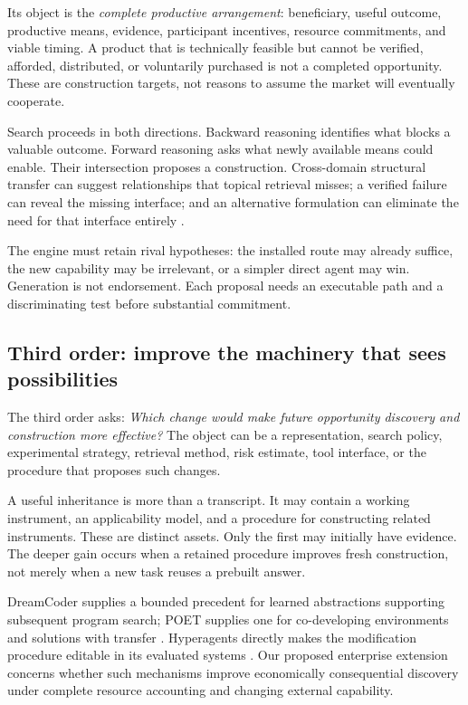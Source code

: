 \documentclass[11pt,letterpaper]{article}
\theoremstyle{remark}\newtheorem{remark}{Remark}[section]
\begin{document}
Its object is the \emph{complete productive arrangement}: beneficiary, useful outcome, productive means, evidence, participant incentives, resource commitments, and viable timing. A product that is technically feasible but cannot be verified, afforded, distributed, or voluntarily purchased is not a completed opportunity. These are construction targets, not reasons to assume the market will eventually cooperate.

Search proceeds in both directions. Backward reasoning identifies what blocks a valuable outcome. Forward reasoning asks what newly available means could enable. Their intersection proposes a construction. Cross-domain structural transfer can suggest relationships that topical retrieval misses; a verified failure can reveal the missing interface; and an alternative formulation can eliminate the need for that interface entirely \citep{boucher2026notes}.

The engine must retain rival hypotheses: the installed route may already suffice, the new capability may be irrelevant, or a simpler direct agent may win. Generation is not endorsement. Each proposal needs an executable path and a discriminating test before substantial commitment.

\subsection{Third order: improve the machinery that sees possibilities}
The third order asks: \emph{Which change would make future opportunity discovery and construction more effective?} The object can be a representation, search policy, experimental strategy, retrieval method, risk estimate, tool interface, or the procedure that proposes such changes.

A useful inheritance is more than a transcript. It may contain a working instrument, an applicability model, and a procedure for constructing related instruments. These are distinct assets. Only the first may initially have evidence. The deeper gain occurs when a retained procedure improves fresh construction, not merely when a new task reuses a prebuilt answer.

DreamCoder supplies a bounded precedent for learned abstractions supporting subsequent program search; POET supplies one for co-developing environments and solutions with transfer \citep{dreamcoder2020,poet2019}. Hyperagents directly makes the modification procedure editable in its evaluated systems \citep{hyperagents2026}. Our proposed enterprise extension concerns whether such mechanisms improve economically consequential discovery under complete resource accounting and changing external capability.
\end{document}
